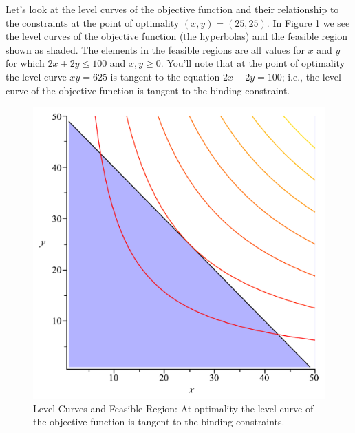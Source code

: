 \begin{example} Let's look at the level curves of the objective function and their relationship to the constraints at the point of optimality $(x,y) = (25,25)$. In Figure \ref{fig:Goat2DPlot} we see the level curves of the objective function (the hyperbolas) and the feasible region shown as shaded. The elements in the feasible regions are all values for $x$ and $y$ for which $2x + 2y \leq 100$ and $x,y \geq 0$. You'll note that at the point of optimality the level curve $xy = 625$ is tangent to the equation $2x + 2y = 100$; i.e., the level curve of the objective function is tangent to the binding constraint.
\begin{figure}[htbp]
\centering
\includegraphics[scale=0.35]{GoatConstraintObjective.pdf}
\caption{Level Curves and Feasible Region: At optimality the level curve of the objective function is tangent to the binding constraints.}
\label{fig:Goat2DPlot}
\end{figure}


\end{example}
